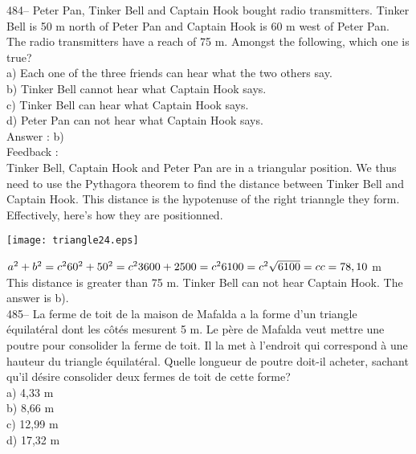 ﻿\documentclass[letterpaper, 12pt]{article}
\begin{document}
484-- Peter Pan, Tinker Bell and Captain Hook bought radio transmitters. Tinker Bell is 50 m north of Peter Pan and Captain Hook is 60 m west of Peter Pan. The radio transmitters have a reach of 75 m. Amongst the following, which one is true?\\
a) Each one of the three friends can hear what the two others say.\\
b) Tinker Bell cannot hear what Captain Hook says.\\
c) Tinker Bell can hear what Captain Hook says.\\
d) Peter Pan can not hear what Captain Hook says.\\

Answer : b)\\

Feedback : \\
Tinker Bell, Captain Hook and Peter Pan are in a triangular position. We thus need to use the Pythagora  theorem to find the distance between Tinker Bell and Captain Hook. This distance is the hypotenuse of the right trianngle they form. Effectively, here's how they are positionned.\\
    \begin{center}
    \texttt{[image: triangle24.eps]}
    \end{center}

$a^{2}+b^{2}=c^{2}\\
60^{2}+50^{2}=c^{2}\\
3600+2500=c^{2}\\
6100=c^{2}\\
\sqrt{6100}=c\\
c=78,10$ m\\
This distance is greater than 75 m.  Tinker Bell can not hear Captain Hook. The answer is b).\\

485--  La ferme de toit de la maison de Mafalda a la forme d'un triangle
\'equilat\'eral dont les c\^ot\'es mesurent 5 m.  Le p\`ere de Mafalda veut
mettre une poutre pour consolider la ferme de toit.  Il la met \`a l'endroit
qui correspond \`a une hauteur du triangle \'equilat\'eral.  Quelle longueur
de poutre doit-il acheter, sachant qu'il d\'esire consolider deux fermes de
toit de cette forme?\\
a) 4,33 m\\
b) 8,66 m\\
c) 12,99 m\\
d) 17,32 m\\
\end{document}
